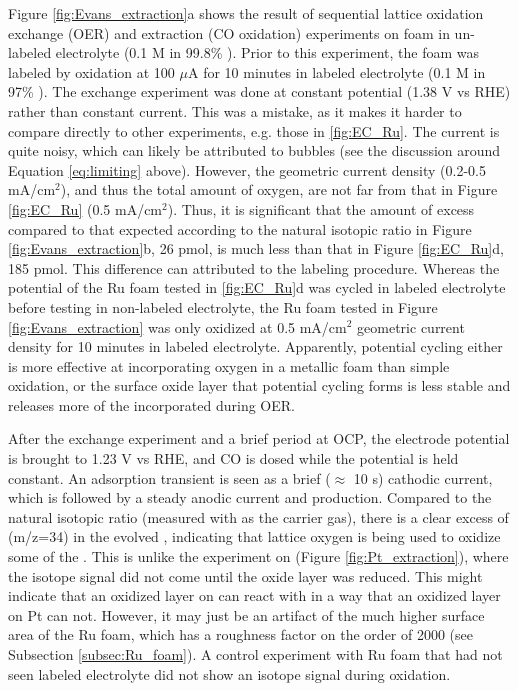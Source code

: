 Figure \ref{fig:Evans_extraction}a shows the result of sequential lattice oxidation exchange (OER) and extraction (CO oxidation) experiments on  foam in un-labeled electrolyte (0.1 M  in 99.8\% ). Prior to this experiment, the foam was labeled by oxidation at 100 $\mu$A for 10 minutes in labeled electrolyte (0.1 M  in 97\% ). The exchange experiment was done at constant potential (1.38 V vs RHE) rather than constant current. This was a mistake, as it makes it harder to compare directly to other experiments, e.g. those in \ref{fig:EC_Ru}. The current is quite noisy, which can likely be attributed to bubbles (see the discussion around Equation \ref{eq:limiting} above). However, the geometric current density (0.2-0.5 mA/cm$^2$), and thus the total amount of oxygen, are not far from that in Figure \ref{fig:EC_Ru} (0.5 mA/cm$^2$). Thus, it is significant that the amount of excess  compared to that expected according to the natural isotopic ratio in Figure \ref{fig:Evans_extraction}b, 26 pmol, is much less than that in Figure \ref{fig:EC_Ru}d, 185 pmol. This difference can attributed to the labeling procedure. Whereas the potential of the Ru foam tested in \ref{fig:EC_Ru}d was cycled in labeled electrolyte before testing in non-labeled electrolyte, the Ru foam tested in Figure \ref{fig:Evans_extraction} was only oxidized at 0.5 mA/cm$^2$ geometric current density for 10 minutes in labeled electrolyte. Apparently, potential cycling either is more effective at incorporating oxygen in a metallic foam than simple oxidation, or the surface oxide layer that potential cycling forms is less stable and releases more of the incorporated  during OER.

After the exchange experiment and a brief period at OCP, the electrode potential is brought to 1.23 V vs RHE, and CO is dosed while the potential is held constant. An adsorption transient is seen as a brief ($\approx$ 10 s) cathodic current, which is followed by a steady anodic current and  production. Compared to the natural isotopic ratio (measured with  as the carrier gas), there is a clear excess of  (m/z=34) in the evolved , indicating that lattice oxygen is being used to oxidize some of the . This is unlike the experiment on  (Figure \ref{fig:Pt_extraction}), where the isotope signal did not come until the oxide layer was reduced. This might indicate that an oxidized layer on  can react with  in a way that an oxidized layer on Pt can not. However, it may just be an artifact of the much higher surface area of the Ru foam, which has a roughness factor on the order of 2000 (see Subsection \ref{subsec:Ru_foam}). A control experiment with Ru foam that had not seen labeled electrolyte did not show an isotope signal during  oxidation.

